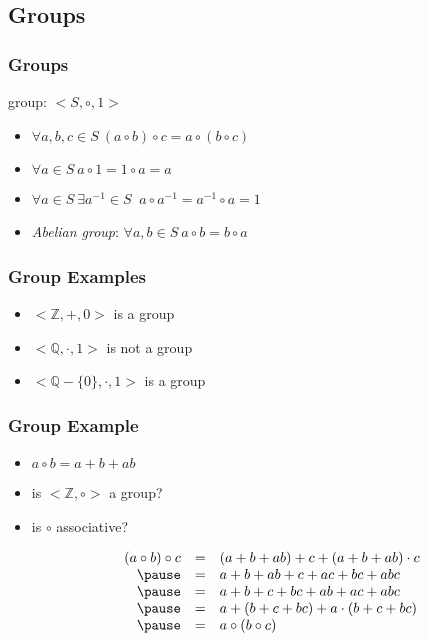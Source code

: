 \documentclass[dvipsnames]{beamer}
\begin{document}
\subsection{Groups}

\begin{frame}
  \frametitle{Groups}

  \begin{definition}
    \alert{group}: $<S,\circ,1>$

    \begin{itemize}
      \item $\forall a,b,c \in S~(a \circ b) \circ c = a \circ (b \circ c)$
      \item $\forall a \in S~a \circ 1 = 1 \circ a = a$
      \item $\forall a \in S~\exists a^{-1} \in S~$
        $a \circ a^{-1} = a^{-1} \circ a = 1$

      \pause
      \medskip
      \item \emph{Abelian group}: $\forall a,b \in S~a \circ b = b \circ a$
    \end{itemize}
  \end{definition}
\end{frame}

\begin{frame}
  \frametitle{Group Examples}

  \begin{itemize}
    \item $<\mathbb{Z},+,0>$ is a group

    \pause
    \medskip
    \item $<\mathbb{Q},\cdot,1>$ is not a group
    \item $<\mathbb{Q}-\{0\},\cdot,1>$ is a group
  \end{itemize}
\end{frame}

\begin{frame}
  \frametitle{Group Example}

  \begin{itemize}
    \item $a \circ b = a + b + ab$\\
    \item is $<\mathbb{Z}, \circ>$ a group?

    \pause
    \medskip
    \item is $\circ$ associative?

    \[ \begin{array}{rcl}
         (a \circ b) \circ c & = & (a + b + ab) + c + (a + b + ab) \cdot c\\\pause
                             & = & a + b + ab + c + ac + bc + abc\\\pause
                             & = & a + b + c + bc + ab + ac + abc\\\pause
                             & = & a + (b + c + bc) + a \cdot (b + c + bc)\\\pause
                             & = & a \circ (b \circ c)
       \end{array} \]
  \end{itemize}
\end{frame}
\end{document}

